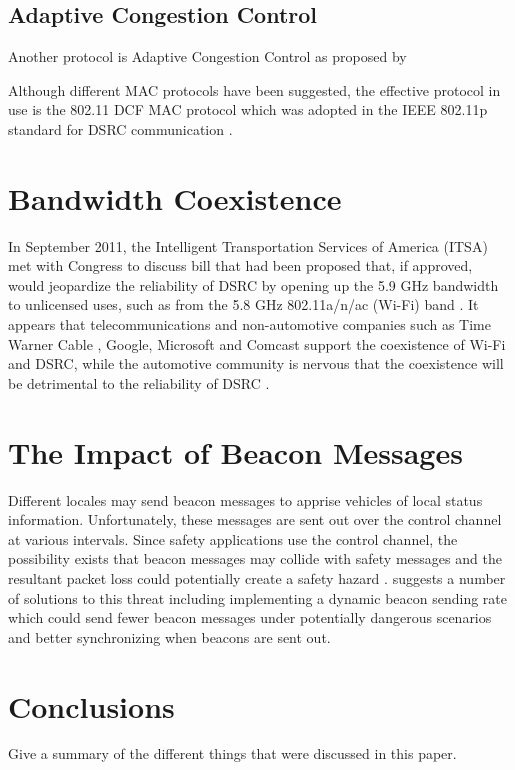 \documentclass[twoside,conference]{IEEEtran}
\begin{document}
		\subsection{Adaptive Congestion Control}\label{sec:acc}
			Another protocol is Adaptive Congestion Control as proposed by \cite[p. 3]{Kolte2014}
		
		Although different MAC protocols have been suggested, the effective protocol in use is the 802.11 DCF MAC protocol which was adopted in the IEEE 802.11p standard for DSRC communication \cite{Hassan2011}.
		
\section{Bandwidth Coexistence}\label{sec:coexistence}
		In September 2011, the Intelligent Transportation Services of America (ITSA) met with Congress to discuss bill that had been proposed that, if approved, would jeopardize the reliability of DSRC by opening up the 5.9 GHz bandwidth to unlicensed uses, such as from the 5.8 GHz 802.11a/n/ac (Wi-Fi) band \cite{ITSA2011,Lansford2013}.  It appears that telecommunications and non-automotive companies such as Time Warner Cable \cite[p. 13--14]{TWC2013}, Google, Microsoft \cite[p. 11]{MicrosoftGoogle2013} and Comcast \cite[p. 30]{Comcast2013} support the coexistence of Wi-Fi and DSRC, while the automotive community is nervous that the coexistence will be detrimental to the reliability of DSRC \cite[p. 16]{Toyota2013}.
		
\section{The Impact of Beacon Messages}\label{sec:beacons}
		Different locales may send beacon messages to apprise vehicles of local status information. Unfortunately, these messages are sent out over the control channel at various intervals. Since safety applications use the control channel, the possibility exists that beacon messages may collide with safety messages and the resultant packet loss could potentially create a safety hazard \cite{Doukha2015}. \cite{Doukha2015} suggests a number of solutions to this threat including implementing a dynamic beacon sending rate which could send fewer beacon messages under potentially dangerous scenarios and better synchronizing when beacons are sent out.

\section{Conclusions}\label{sec:conclusions}
	Give a summary of the different things that were discussed in this paper.

\cleardoublepage


\end{document}
